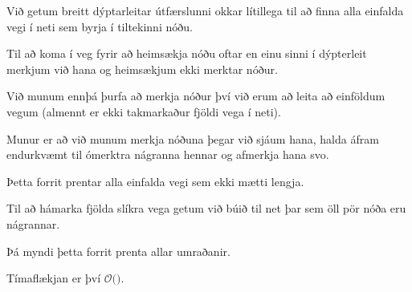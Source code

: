 {
}

{
	{
		\item<1-> Við getum breitt dýptarleitar útfærslunni okkar lítillega til að finna alla einfalda vegi í neti sem byrja í tiltekinni nóðu.
		\item<2-> Til að koma í veg fyrir að heimsækja nóðu oftar en einu sinni í dýpterleit merkjum við hana og heimsækjum ekki merktar nóður.
		\item<3-> Við munum ennþá þurfa að merkja nóður því við erum að leita að einföldum vegum (almennt er ekki takmarkaður fjöldi vega í neti).
		\item<4-> Munur er að við munum merkja nóðuna þegar við sjáum hana, halda áfram endurkvæmt til ómerktra nágranna hennar og afmerkja hana svo.
	}
}

{
	{
		\item<1->[]	
		\item<2-> Þetta forrit prentar alla einfalda vegi sem ekki mætti lengja.
		\item<3-> Til að hámarka fjölda slíkra vega getum við búið til net þar sem öll pör nóða eru nágrannar.
		\item<4-> Þá myndi þetta forrit prenta allar umraðanir.
		\item<5-> Tímaflækjan er því $\mathcal{O}($\onslide<6->{$(V + 1)!$}$)$.
	}
}

{
}


